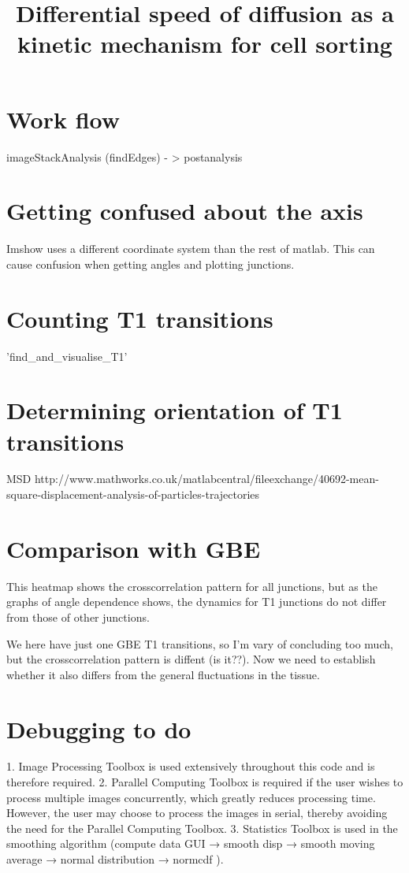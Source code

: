 \documentclass[a4paper,10pt]{article}
\title{Differential speed of diffusion as a kinetic mechanism for cell sorting}
\begin{document}
\maketitle
{}

\section{Work flow}

imageStackAnalysis (findEdges) - > postanalysis


\section{Getting confused about the axis}

Imshow uses a different coordinate system than the rest of matlab. This can cause confusion when getting angles and plotting junctions.

\section{Counting T1 transitions}

'find_and_visualise_T1'

\section{Determining orientation of T1 transitions}
MSD
http://www.mathworks.co.uk/matlabcentral/fileexchange/40692-mean-square-displacement-analysis-of-particles-trajectories


\section{Comparison with GBE}
This heatmap shows the crosscorrelation pattern for all junctions, but as the graphs of angle dependence shows, the dynamics for T1 junctions do not differ from those of other junctions.

We here have just one GBE T1 transitions, so I'm vary of concluding too much, but the crosscorrelation pattern is diffent (is it??). Now we need to establish whether it also differs from the general fluctuations in the tissue.

\section{Debugging to do}

1. Image Processing Toolbox is used extensively throughout this code and is therefore required.
2. Parallel Computing Toolbox is required if the user wishes to process multiple images concurrently, which greatly reduces processing time. However, the user may choose to process the images in serial, thereby avoiding the need for the Parallel Computing Toolbox.
3. Statistics Toolbox is used in the smoothing algorithm (compute data GUI → smooth disp → smooth moving average → normal distribution → normcdf ).
\end{document}
